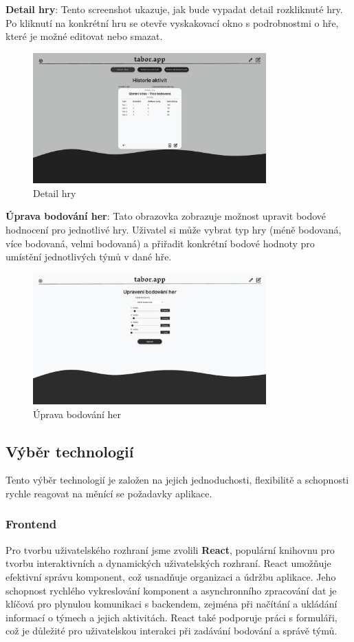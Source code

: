 \documentclass[a4paper, 12pt]{article} %
\begin{document}
\textbf{Detail hry}: Tento screenshot ukazuje, jak bude vypadat detail rozkliknuté hry. 
Po kliknutí na konkrétní hru se otevře vyskakovací okno s podrobnostmi o hře, které je možné 
editovat nebo smazat.
\begin{figure}[h!]
    \centering
    \includegraphics[width=0.8\textwidth]{./pictures/picture5.png}
    \caption{Detail hry}
\end{figure}

\textbf{Úprava bodování her}: Tato obrazovka zobrazuje možnost upravit bodové hodnocení 
pro jednotlivé hry. Uživatel si může vybrat typ hry (méně bodovaná, více bodovaná, 
velmi bodovaná) a přiřadit konkrétní bodové hodnoty pro umístění jednotlivých týmů v dané hře. 
\begin{figure}[h!]
    \centering
    \includegraphics[width=0.8\textwidth]{./pictures/picture7.png}
    \caption{Úprava bodování her}
\end{figure}

\subsection{Výběr technologií}
Tento výběr technologií je založen na jejich jednoduchosti, flexibilitě a schopnosti 
rychle reagovat na měnící se požadavky aplikace.

\subsubsection{Frontend}
Pro tvorbu uživatelského rozhraní jsme zvolili \textbf{React}, populární knihovnu pro 
tvorbu interaktivních a dynamických uživatelských rozhraní. React umožňuje efektivní správu 
komponent, což usnadňuje organizaci a údržbu aplikace. Jeho schopnost rychlého vykreslování 
komponent a asynchronního zpracování dat je klíčová pro plynulou komunikaci s backendem, 
zejména při načítání a ukládání informací o týmech a jejich aktivitách. React také podporuje 
práci s formuláři, což je důležité pro uživatelskou interakci při zadávání bodování a správě 
týmů.
\end{document}

